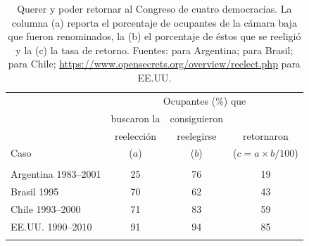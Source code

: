 \documentclass[letter,12pt]{article}
\newcommand{\mc}{\multicolumn}
\begin{document}
\begin{table}
  \centering
  \begin{tabular}{lccc}
                         & \mc{3}{c}{Ocupantes (\%) que} \\ 
                         & buscaron la & consiguieron    &            \\ [-.5ex]
                         & reelección  & reelegirse      & retornaron \\ [-.5ex]
    Caso                 & ($a$)       & ($b$)           & ($c=a\times b/100$) \\ \hline \\ [-1.25ex] 
    Argentina 1983--2001 & 25          &  76             &     19     \\
    Brasil 1995          & 70          &  62             &     43     \\
    Chile 1993--2000     & 71          &  83             &     59     \\
    EE.UU. 1990--2010    & 91          &  94             &     85     \\ \\ [-1.25ex] \hline
  \end{tabular}
  \caption{Querer y poder retornar al Congreso de cuatro democracias. La columna (a) reporta el porcentaje de ocupantes de la cámara baja que fueron renominados, la (b) el porcentaje de éstos que se reeligió y la (c) la tasa de retorno. Fuentes: \citet[][:658]{jones.etal.amateurLegis.2002} para Argentina; \citet[][:415--6]{morgenstern.2002b} para Brasil; \citet{naviaIncumbency.2000} para Chile; \url{https://www.opensecrets.org/overview/reelect.php} para EE.UU.}\label{T:retRate}
\end{table}
\end{document}
